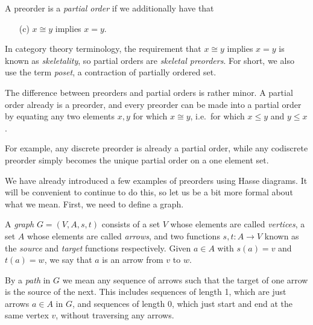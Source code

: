 \documentclass[7Sketches]{subfiles}
\begin{document}
\begin{remark} %
\label{rem.partial_orders}
\label{rem.skeletal_preorder}%
%
A preorder is a \emph{partial order} if we additionally have that
\begin{enumerate}
  \item[(c)] $x \cong y$ implies $x =y$.  
\end{enumerate}

In category theory terminology, the requirement that $x \cong y$ implies $x =y$
is known as \emph{skeletality}, so partial orders are \emph{skeletal
preorders}.%
For short, we also use the term \emph{poset}, a contraction of partially ordered
set.%
%
%

The difference between preorders and partial orders is rather minor. A partial order already is a preorder, and every preorder can be made into a partial order by equating any two elements $x,y$ for which $x\cong y$, i.e.\ for which $x\leq y$ and $y\leq x$.

For example, any discrete preorder is already a partial order, while any
codiscrete preorder simply becomes the unique partial order on a one element
set.
\end{remark}

We have already introduced a few examples of preorders using Hasse diagrams. It
will be convenient to continue to do this, so let us be a bit more formal about
what we mean. First, we need to define a graph.

\begin{definition} %
\label{def.graph}%
%
%
A \emph{graph} $G=(V,A,s,t)$ consists of a set $V$ whose elements are called
\emph{vertices}, a set $A$ whose elements are called \emph{arrows}, and two
functions $s,t\colon A \to V$ known as the \emph{source} and \emph{target}
functions respectively. Given $a \in A$ with $s(a)=v$ and $t(a)=w$, we say that
$a$ is an arrow from $v$ to $w$.

By a \emph{path} in $G$ we mean any sequence of
arrows such that the target of one arrow is the source of the next. This
includes sequences of length 1, which are just arrows $a\in A$ in $G$, and
sequences of length 0, which just start and end at the same vertex $v$, without
traversing any arrows. %
\end{definition}
\end{document}
